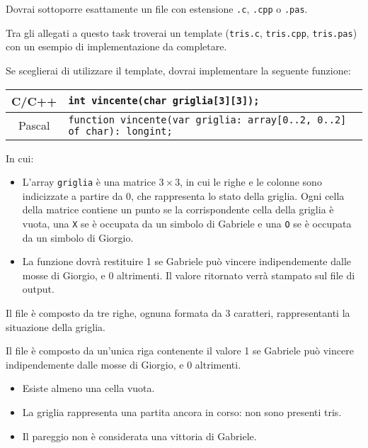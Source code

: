 \Implementation
Dovrai sottoporre esattamente un file con estensione \texttt{.c}, \texttt{.cpp} o \texttt{.pas}.

\begin{warning}
Tra gli allegati a questo task troverai un template (\texttt{tris.c}, \texttt{tris.cpp}, \texttt{tris.pas}) con un esempio di implementazione da completare.
\end{warning}

Se sceglierai di utilizzare il template, dovrai implementare la seguente funzione:
\begin{center}\begin{tabularx}{\textwidth}{|c|X|}
\hline
C/C++  & \verb|int vincente(char griglia[3][3]);|\\
\hline
Pascal & \verb|function vincente(var griglia: array[0..2, 0..2] of char): longint;|\\
\hline
\end{tabularx}\end{center}
In cui:
\begin{itemize}[nolistsep]
  \item L'array \texttt{griglia} è una matrice $3\times 3$, in cui le righe e le colonne sono indicizzate a partire da 0, che rappresenta lo stato della griglia. Ogni cella della matrice contiene un punto se la corrispondente cella della griglia è vuota, una \texttt{X} se è occupata da un simbolo di Gabriele e una \texttt{O} se è occupata da un simbolo di Giorgio. 
  \item La funzione dovrà restituire 1 se Gabriele può vincere indipendemente dalle mosse di Giorgio, e 0 altrimenti. Il valore ritornato verrà stampato sul file di output.
\end{itemize}

\InputFile
Il file  è composto da tre righe, ognuna formata da 3 caratteri, rappresentanti la situazione della griglia.

\OutputFile
Il file \outputfile{} è composto da un'unica riga contenente il valore 1 se Gabriele può vincere indipendemente dalle mosse di Giorgio, e 0 altrimenti.

\Constraints
\begin{itemize}[nolistsep, itemsep=2mm]
	\item Esiste almeno una cella vuota.
	\item La griglia rappresenta una partita ancora in corso: non sono presenti tris.
	\item Il pareggio non è considerata una vittoria di Gabriele.
\end{itemize}

